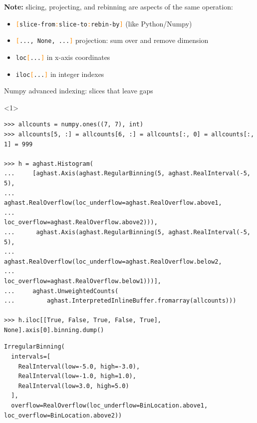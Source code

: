 \documentclass[aspectratio=169]{beamer}
\begin{document}
\begin{frame}{}
\vspace{1 cm}
\large
\begin{center}
{\bf Note:} slicing, projecting, and rebinning are aspects of the same operation:

\vspace{0.5 cm}
\begin{minipage}{0.9\linewidth}
\begin{itemize}
\item {\tt \textcolor{darkorange}{[}slice-from\textcolor{darkorange}{:}slice-to\textcolor{darkorange}{:}rebin-by\textcolor{darkorange}{]}} (like Python/Numpy)
\item {\tt \textcolor{darkorange}{[}..., None, ...\textcolor{darkorange}{]}} projection: sum over and remove dimension
\item {\tt loc\textcolor{darkorange}{[}...\textcolor{darkorange}{]}} in x-axis coordinates
\item {\tt iloc\textcolor{darkorange}{[}...\textcolor{darkorange}{]}} in integer indexes
\end{itemize}
\end{minipage}
\end{center}
\end{frame}

\begin{frame}[fragile]{Numpy advanced indexing: slices that leave gaps}
\scriptsize
\vspace{0.4 cm}
\begin{onlyenv}<1>
\begin{verbatim}
>>> allcounts = numpy.ones((7, 7), int)
>>> allcounts[5, :] = allcounts[6, :] = allcounts[:, 0] = allcounts[:, 1] = 999

>>> h = aghast.Histogram(
...     [aghast.Axis(aghast.RegularBinning(5, aghast.RealInterval(-5, 5),
...                  aghast.RealOverflow(loc_underflow=aghast.RealOverflow.above1,
...                                      loc_overflow=aghast.RealOverflow.above2))),
...      aghast.Axis(aghast.RegularBinning(5, aghast.RealInterval(-5, 5),
...                  aghast.RealOverflow(loc_underflow=aghast.RealOverflow.below2,
...                                      loc_overflow=aghast.RealOverflow.below1)))],
...     aghast.UnweightedCounts(
...         aghast.InterpretedInlineBuffer.fromarray(allcounts)))

>>> h.iloc[[True, False, True, False, True], None].axis[0].binning.dump()
\end{verbatim}
\begin{verbatim}
IrregularBinning(
  intervals=[
    RealInterval(low=-5.0, high=-3.0),
    RealInterval(low=-1.0, high=1.0),
    RealInterval(low=3.0, high=5.0)
  ],
  overflow=RealOverflow(loc_underflow=BinLocation.above1, loc_overflow=BinLocation.above2))
\end{verbatim}
\end{onlyenv}






\end{frame}
\end{document}
